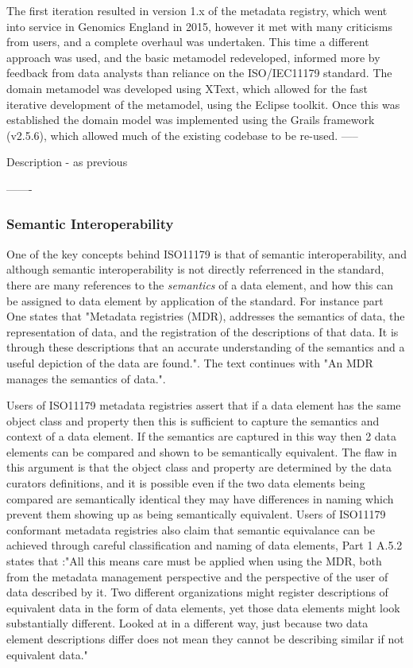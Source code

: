 \documentclass[runningheads]{llncs}
\begin{document}
	
	The first iteration resulted in version 1.x of the metadata registry, which went into service in Genomics England in 2015, however it met with many criticisms from users, and a complete overhaul was undertaken. This time a different approach was used, and the basic metamodel redeveloped, informed more by feedback from data analysts than reliance on the ISO/IEC11179 standard. The domain metamodel was developed using XText, which allowed for the fast iterative development of the metamodel, using the Eclipse toolkit. Once this was established the domain model was implemented using the Grails framework (v2.5.6), which allowed much of the existing codebase to be re-used.
	-----
	
	
	Description - as previous
	
	-------
	\subsubsection{Semantic Interoperability}
	
	One of the key concepts behind ISO11179 is that of semantic interoperability, and although semantic interoperability is not directly referrenced in the standard, there are many references to the \emph{semantics} of a data element, and how this can be assigned to data element by application of the standard. For instance part One states that "Metadata registries (MDR), addresses the semantics of data, the	representation of data, and the registration of the descriptions of that data. It is through these descriptions that an accurate understanding of the semantics and a useful depiction of the data are found.". The text continues with "An MDR manages the semantics of data.". 
	
	Users of ISO11179 metadata registries assert that if a data element has the same object class and property then this is sufficient to capture the semantics and context of a data element. If the semantics are captured in this way then 2 data elements can be compared and shown to be semantically equivalent. The flaw in this argument is that the object class and property are determined by the data curators definitions, and it is possible even if the two data elements being compared are semantically identical they may have differences in naming which prevent them showing up as being semantically equivalent.  Users of ISO11179 conformant metadata registries also claim that semantic equivalance can be achieved through careful classification and naming of data elements, Part 1 A.5.2 states that :"All this means care must be applied when using the MDR, both from the metadata management perspective and the perspective of the user of data described by it. Two different organizations might register descriptions of equivalent data in the form of data elements, yet those data elements might look substantially different. Looked at in a different way, just because two data element descriptions differ does not mean they cannot be describing similar if not equivalent data." 
	
\end{document}
